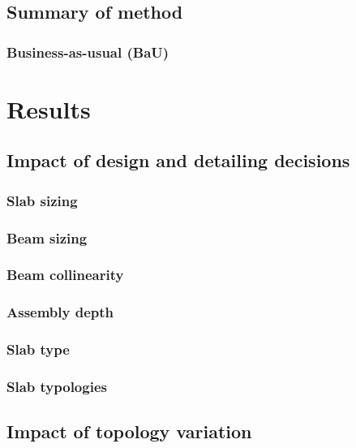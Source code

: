 \documentclass[10pt, letterpaper]{article} %
\begin{document}
    \subsection{Summary of method}

    \subsubsection{Business-as-usual (BaU)}

    \section{Results}\label{sec:results}

    \subsection{Impact of design and detailing decisions}\label{sec:design-impacts}

    \subsubsection{Slab sizing}

    \subsubsection{Beam sizing}

    \subsubsection{Beam collinearity}

    \subsubsection{Assembly depth}

    \subsubsection{Slab type}

    \subsubsection{Slab typologies}

    \subsection{Impact of topology variation}
\end{document}
